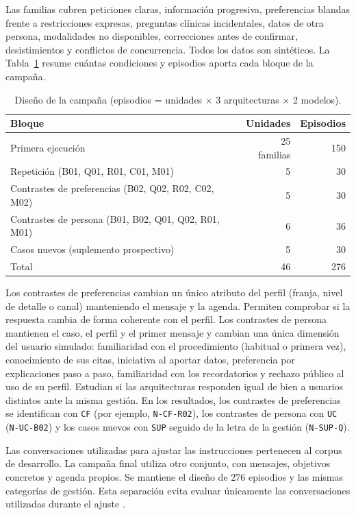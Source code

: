Las familias cubren peticiones claras, información progresiva, preferencias
blandas frente a restricciones expresas, preguntas clínicas incidentales, datos
de otra persona, modalidades no disponibles, correcciones antes de confirmar,
desistimientos y conflictos de concurrencia. Todos los datos son sintéticos.
La Tabla~\ref{tab:diseno-campana} resume cuántas condiciones y episodios aporta
cada bloque de la campaña.

\begin{table}[!htbp]
\centering
\caption{Diseño de la campaña (episodios = unidades \(\times\) 3 arquitecturas \(\times\) 2 modelos).}
\label{tab:diseno-campana}
\begin{tabular}{lrr}
\toprule
Bloque & Unidades & Episodios \\
\midrule
Primera ejecución & 25 familias & 150 \\
Repetición (B01, Q01, R01, C01, M01) & 5 & 30 \\
Contrastes de preferencias (B02, Q02, R02, C02, M02) & 5 & 30 \\
Contrastes de persona (B01, B02, Q01, Q02, R01, M01) & 6 & 36 \\
Casos nuevos (suplemento prospectivo) & 5 & 30 \\
\midrule
Total & 46 & 276 \\
\bottomrule
\end{tabular}
\end{table}

Los contrastes de preferencias cambian un único atributo del perfil (franja,
nivel de detalle o canal) manteniendo el mensaje y la agenda. Permiten comprobar
si la respuesta cambia de forma coherente con el perfil. Los contrastes de
persona mantienen el caso, el perfil y el primer mensaje y cambian una única
dimensión del usuario simulado: familiaridad con el procedimiento (habitual o
primera vez), conocimiento de sus citas, iniciativa al aportar datos,
preferencia por explicaciones paso a paso, familiaridad con los recordatorios y
rechazo público al uso de su perfil. Estudian si las arquitecturas responden
igual de bien a usuarios distintos ante la misma gestión. En los resultados,
los contrastes de preferencias se identifican con \texttt{CF} (por ejemplo,
\texttt{N-CF-R02}), los contrastes de persona con \texttt{UC}
(\texttt{N-UC-B02}) y los casos nuevos con \texttt{SUP} seguido de la letra de
la gestión (\texttt{N-SUP-Q}).

Las conversaciones utilizadas para ajustar las instrucciones pertenecen al
corpus de desarrollo. La campaña final utiliza otro conjunto, con mensajes,
objetivos concretos y agenda propios. Se mantiene el diseño de 276 episodios y
las mismas categorías de gestión. Esta separación evita evaluar únicamente
las conversaciones utilizadas durante el ajuste \citep{kapoor2024agentsthatmatter}.

